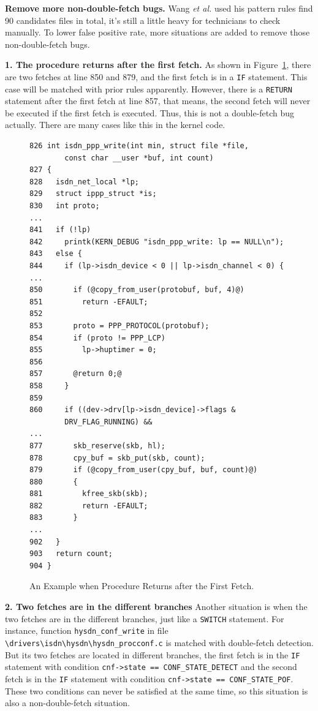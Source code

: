 \documentclass[10pt]{llncs}
\begin{document}
\textbf{Remove more non-double-fetch bugs.}
Wang \textit{et al.} used his pattern rules find 90 candidates files in total, it's still a little heavy for technicians to check manually. To lower false positive rate, more situations are added to remove those non-double-fetch bugs.

\textbf{1. The procedure returns after the first fetch.}
As shown in Figure~\ref{return}, there are two fetches at line 850 and 879, and the first fetch is in a \verb:IF: statement. This case will be matched with prior rules apparently. However, there is a \verb:RETURN: statement after the first fetch at line 857, that means, the second fetch will never be executed if the first fetch is executed. Thus, this is not a double-fetch bug actually. There are many cases like this in the kernel code.

\begin{figure}[t]
  \centering
\begin{lstlisting}[style=code]
826 int isdn_ppp_write(int min, struct file *file, 
        const char __user *buf, int count)
827 {
828   isdn_net_local *lp;
829   struct ippp_struct *is;
830   int proto;
...
841   if (!lp)
842     printk(KERN_DEBUG "isdn_ppp_write: lp == NULL\n");
843   else {
844     if (lp->isdn_device < 0 || lp->isdn_channel < 0) {
...
850       if (@copy_from_user(protobuf, buf, 4)@)
851         return -EFAULT;
852 
853       proto = PPP_PROTOCOL(protobuf);
854       if (proto != PPP_LCP)
855         lp->huptimer = 0;
856 
857       @return 0;@
858     }
859 
860     if ((dev->drv[lp->isdn_device]->flags & 
        DRV_FLAG_RUNNING) &&
...
877       skb_reserve(skb, hl);
878       cpy_buf = skb_put(skb, count);
879       if (@copy_from_user(cpy_buf, buf, count)@)
880       {
881         kfree_skb(skb);
882         return -EFAULT;
883       }
...
902   }
903   return count;
904 } 
\end{lstlisting}
  \caption{An Example when Procedure Returns after the First Fetch.}
  \label{return}
\end{figure}

\textbf{2. Two fetches are in the different branches}
Another situation is when the two fetches are in the different branches, just like a \verb:SWITCH: statement. For instance, function \verb:hysdn_conf_write: in file \verb:\drivers\isdn\hysdn\hysdn_procconf.c: is matched with double-fetch detection. But its two fetches are located in different branches, the first fetch is in the \verb:IF: statement with condition \verb:cnf->state == CONF_STATE_DETECT: and the second fetch is in the \verb:IF: statement with condition \verb:cnf->state == CONF_STATE_POF:. These two conditions can never be satisfied at the same time, so this situation is also a non-double-fetch situation.
\end{document}

